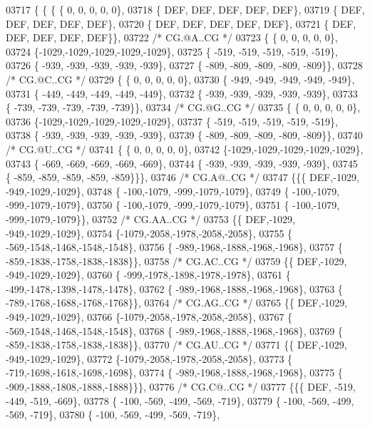 \begin{DoxyCode}
03717 \{ \{ \{ \{  0, 0, 0, 0, 0\},
03718 \{  DEF,  DEF,  DEF,  DEF,  DEF\},
03719 \{  DEF,  DEF,  DEF,  DEF,  DEF\},
03720 \{  DEF,  DEF,  DEF,  DEF,  DEF\},
03721 \{  DEF,  DEF,  DEF,  DEF,  DEF\}\},
03722 \textcolor{comment}{/* CG.@A..CG */}
03723 \{ \{  0, 0, 0, 0, 0\},
03724 \{-1029,-1029,-1029,-1029,-1029\},
03725 \{ -519, -519, -519, -519, -519\},
03726 \{ -939, -939, -939, -939, -939\},
03727 \{ -809, -809, -809, -809, -809\}\},
03728 \textcolor{comment}{/* CG.@C..CG */}
03729 \{ \{  0, 0, 0, 0, 0\},
03730 \{ -949, -949, -949, -949, -949\},
03731 \{ -449, -449, -449, -449, -449\},
03732 \{ -939, -939, -939, -939, -939\},
03733 \{ -739, -739, -739, -739, -739\}\},
03734 \textcolor{comment}{/* CG.@G..CG */}
03735 \{ \{  0, 0, 0, 0, 0\},
03736 \{-1029,-1029,-1029,-1029,-1029\},
03737 \{ -519, -519, -519, -519, -519\},
03738 \{ -939, -939, -939, -939, -939\},
03739 \{ -809, -809, -809, -809, -809\}\},
03740 \textcolor{comment}{/* CG.@U..CG */}
03741 \{ \{  0, 0, 0, 0, 0\},
03742 \{-1029,-1029,-1029,-1029,-1029\},
03743 \{ -669, -669, -669, -669, -669\},
03744 \{ -939, -939, -939, -939, -939\},
03745 \{ -859, -859, -859, -859, -859\}\}\},
03746 \textcolor{comment}{/* CG.A@..CG */}
03747 \{\{\{  DEF,-1029, -949,-1029,-1029\},
03748 \{ -100,-1079, -999,-1079,-1079\},
03749 \{ -100,-1079, -999,-1079,-1079\},
03750 \{ -100,-1079, -999,-1079,-1079\},
03751 \{ -100,-1079, -999,-1079,-1079\}\},
03752 \textcolor{comment}{/* CG.AA..CG */}
03753 \{\{  DEF,-1029, -949,-1029,-1029\},
03754 \{-1079,-2058,-1978,-2058,-2058\},
03755 \{ -569,-1548,-1468,-1548,-1548\},
03756 \{ -989,-1968,-1888,-1968,-1968\},
03757 \{ -859,-1838,-1758,-1838,-1838\}\},
03758 \textcolor{comment}{/* CG.AC..CG */}
03759 \{\{  DEF,-1029, -949,-1029,-1029\},
03760 \{ -999,-1978,-1898,-1978,-1978\},
03761 \{ -499,-1478,-1398,-1478,-1478\},
03762 \{ -989,-1968,-1888,-1968,-1968\},
03763 \{ -789,-1768,-1688,-1768,-1768\}\},
03764 \textcolor{comment}{/* CG.AG..CG */}
03765 \{\{  DEF,-1029, -949,-1029,-1029\},
03766 \{-1079,-2058,-1978,-2058,-2058\},
03767 \{ -569,-1548,-1468,-1548,-1548\},
03768 \{ -989,-1968,-1888,-1968,-1968\},
03769 \{ -859,-1838,-1758,-1838,-1838\}\},
03770 \textcolor{comment}{/* CG.AU..CG */}
03771 \{\{  DEF,-1029, -949,-1029,-1029\},
03772 \{-1079,-2058,-1978,-2058,-2058\},
03773 \{ -719,-1698,-1618,-1698,-1698\},
03774 \{ -989,-1968,-1888,-1968,-1968\},
03775 \{ -909,-1888,-1808,-1888,-1888\}\}\},
03776 \textcolor{comment}{/* CG.C@..CG */}
03777 \{\{\{  DEF, -519, -449, -519, -669\},
03778 \{ -100, -569, -499, -569, -719\},
03779 \{ -100, -569, -499, -569, -719\},
03780 \{ -100, -569, -499, -569, -719\},

\end{DoxyCode}
